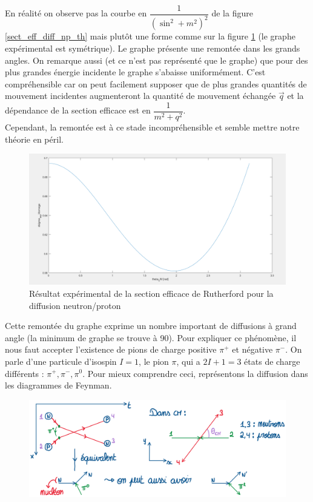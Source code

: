 En réalité on observe pas la courbe en $\dfrac{1}{(\sin^2 + m^2)^2}$ de la figure \ref{sect_eff_diff_np_th} mais plutôt une forme comme sur la figure \ref{sect_eff_diff_np_exp} (le graphe expérimental est symétrique). Le graphe présente une remontée dans les grands angles. On remarque aussi (et ce n'est pas représenté que le graphe) que pour des plus grandes énergie incidente le graphe s'abaisse uniformément. C'est compréhensible car on peut facilement supposer que de plus grandes quantités de mouvement incidentes augmenteront la quantité de mouvement échangée $\Vec{q}$ et la dépendance de la section efficace est en $\dfrac{1}{m^2 + q^2}$.\\
Cependant, la remontée est à ce stade incompréhensible et semble mettre notre théorie en péril.\\
\begin{figure}[H]
    \centering
    \includegraphics[scale = 0.3]{Images4/Diffusion3.PNG}
    \caption{Résultat expérimental de la section efficace de Rutherford pour la diffusion neutron/proton}
    \label{sect_eff_diff_np_exp}
\end{figure}
Cette remontée du graphe exprime un nombre important de diffusions à grand angle (la minimum de graphe se trouve à 90\degree). Pour expliquer ce phénomène, il nous faut accepter l'existence de pions de charge positive $\pi^+$ et négative $\pi^-$. On parle d'une particule d'isospin $I=1$, le pion $\pi$, qui a $2I +1 =3$ états de charge différents : $\pi^+,\pi^-,\pi^0$. Pour mieux comprendre ceci, représentons la diffusion dans les diagrammes de Feynman.
\begin{figure}[H]
    \centering
    \includegraphics[scale = 0.5]{Images4/Feynmann_pi.png}
\end{figure}
